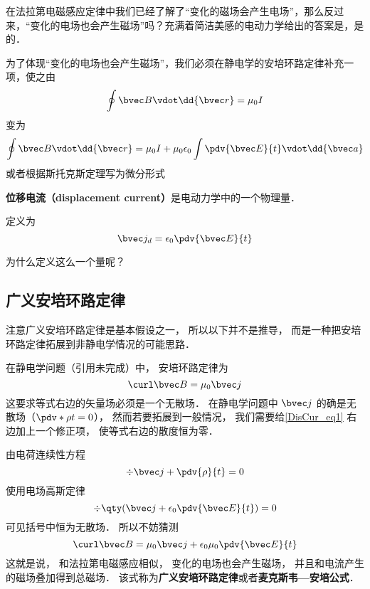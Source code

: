 
\begin{issues}
\issueDraft
\end{issues}

在法拉第电磁感应定律中我们已经了解了“变化的磁场会产生电场”，那么反过来，“变化的电场也会产生磁场”吗？充满着简洁美感的电动力学给出的答案是，是的．

为了体现“变化的电场也会产生磁场”，我们必须在静电学的安培环路定律补充一项，使之由
\begin{equation}
\oint \bvec B \vdot \dd{\bvec r} = \mu_0 I
\end{equation}
变为
\begin{equation}
\oint \bvec B \vdot \dd{\bvec r} = \mu_0 I + \mu_0 \epsilon_0 \int \pdv{\bvec E}{t} \vdot \dd{\bvec a}
\end{equation}
或者根据斯托克斯定理写为微分形式
\begin{equation}

\end{equation}



\textbf{位移电流（displacement current）}是电动力学中的一个物理量．

定义为
\begin{equation}
\bvec j_d = \epsilon_0 \pdv{\bvec E}{t}
\end{equation}

为什么定义这么一个量呢？

\subsection{广义安培环路定律}

注意广义安培环路定律是基本假设之一， 所以以下并不是推导， 而是一种把安培环路定律拓展到非静电学情况的可能思路．

在静电学问题（引用未完成）中， 安培环路定律为
\begin{equation}\label{DisCur_eq1}
\curl\bvec B = \mu_0\bvec j
\end{equation}
这要求等式右边的矢量场必须是一个无散场． 在静电学问题中 $\bvec j$ 的确是无散场（$\pdv*{\rho}{t} = 0$）， 然而若要拓展到一般情况， 我们需要给\autoref{DisCur_eq1} 右边加上一个修正项， 使等式右边的散度恒为零．

由电荷连续性方程
\begin{equation}
\div \bvec j + \pdv{\rho}{t} = 0
\end{equation}
使用电场高斯定律
\begin{equation}
\div \qty(\bvec j + \epsilon_0\pdv{\bvec E}{t}) = 0
\end{equation}
可见括号中恒为无散场． 所以不妨猜测
\begin{equation}
\curl\bvec B = \mu_0\bvec j + \epsilon_0\mu_0\pdv{\bvec E}{t}
\end{equation}
这就是说， 和法拉第电磁感应相似， 变化的电场也会产生磁场， 并且和电流产生的磁场叠加得到总磁场． 该式称为\textbf{广义安培环路定律}或者\textbf{麦克斯韦—安培公式}．
